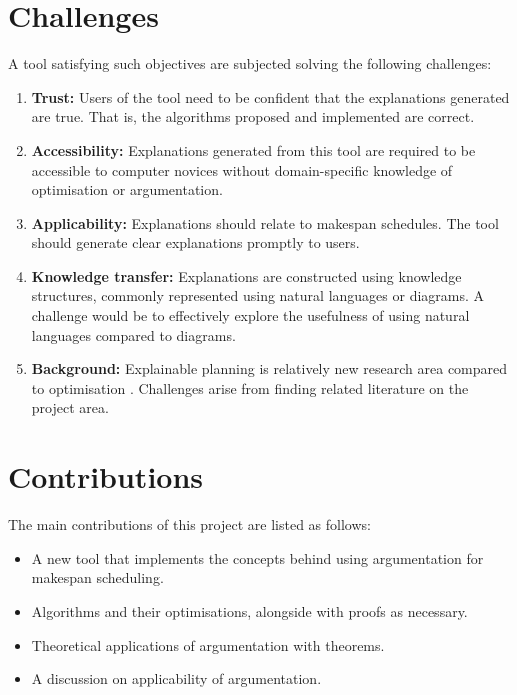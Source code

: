 \section{Challenges}

A tool satisfying such objectives are subjected solving the following challenges:
\begin{enumerate}
	\item\textbf{Trust:} Users of the tool need to be confident that the explanations generated are true. That is, the algorithms proposed and implemented are correct.
	\item\textbf{Accessibility:} Explanations generated from this tool are required to be accessible to computer novices without domain-specific knowledge of optimisation or argumentation.
	\item\textbf{Applicability:} Explanations should relate to makespan schedules. The tool should generate clear explanations promptly to users.
	\item\textbf{Knowledge transfer:} Explanations are constructed using knowledge structures, commonly represented using natural languages or diagrams. A challenge would be to effectively explore the usefulness of using natural languages compared to diagrams.
	\item\textbf{Background:} Explainable planning is relatively new research area compared to optimisation \cite{pe}. Challenges arise from finding related literature on the project area.
\end{enumerate}

\section{Contributions}
\label{introcontributions}

The main contributions of this project are listed as follows:
\begin{itemize}
	\item A new tool \emph{\toolname} that implements the concepts behind using argumentation for makespan scheduling.
	\item Algorithms and their optimisations, alongside with proofs as necessary.
	\item Theoretical applications of argumentation with theorems.
	\item A discussion on applicability of argumentation.
\end{itemize}
